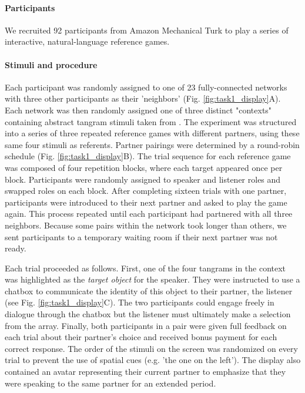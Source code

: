 \paragraph{Participants}

We recruited 92 participants from Amazon Mechanical Turk to play a series of interactive, natural-language reference games. 

\paragraph{Stimuli and procedure}

Each participant was randomly assigned to one of 23 fully-connected networks with three other participants as their 'neighbors' (Fig. \ref{fig:task1_display}A). 
Each network was then randomly assigned one of three distinct "contexts" containing abstract tangram stimuli taken from \cite{ClarkWilkesGibbs86_ReferringCollaborative}.
The experiment was structured into a series of three repeated reference games with different partners, using these same four stimuli as referents.
Partner pairings were determined by a round-robin schedule (Fig. \ref{fig:task1_display}B).
The trial sequence for each reference game was composed of four repetition blocks, where each target appeared once per block.
Participants were randomly assigned to speaker and listener roles and swapped roles on each block.
After completing sixteen trials with one partner, participants were introduced to their next partner and asked to play the game again. 
This process repeated until each participant had partnered with all three neighbors.
Because some pairs within the network took longer than others, we sent participants to a temporary waiting room if their next partner was not ready. 

Each trial proceeded as follows.
First, one of the four tangrams in the context was highlighted as the \emph{target object} for the speaker.
They were instructed to use a chatbox to communicate the identity of this object to their partner, the listener (see Fig. \ref{fig:task1_display}C).
The two participants could engage freely in dialogue through the chatbox but the listener must ultimately make a selection from the array. 
Finally, both participants in a pair were given full feedback on each trial about their partner's choice and received bonus payment for each correct response. 
The order of the stimuli on the screen was randomized on every trial to prevent the use of spatial cues (e.g. 'the one on the left').
The display also contained an avatar representing their current partner to emphasize that they were speaking to the same partner for an extended period.

